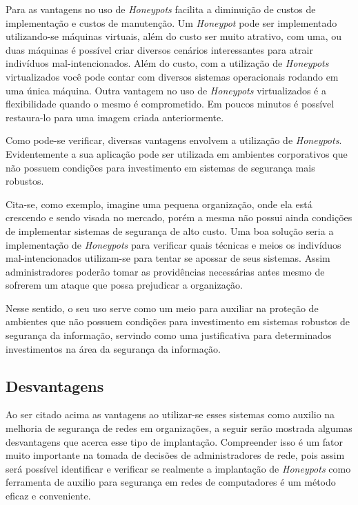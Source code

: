Para  as vantagens no uso de \textit{Honeypots} facilita a diminuição de custos de implementação e custos de manutenção. Um \textit{Honeypot} pode ser implementado utilizando-se máquinas virtuais, além do custo ser muito atrativo, com uma, ou duas máquinas é possível criar diversos cenários interessantes para atrair indivíduos mal-intencionados. Além do custo, com a utilização de \textit{Honeypots} virtualizados você pode contar com diversos sistemas operacionais rodando em uma única máquina. Outra vantagem no uso de \textit{Honeypots} virtualizados é a flexibilidade quando o mesmo é comprometido. Em poucos minutos é possível restaura-lo para uma imagem criada anteriormente.

Como pode-se verificar, diversas vantagens envolvem a utilização de \textit{Honeypots}. Evidentemente a sua aplicação pode ser utilizada em ambientes corporativos que não possuem condições para investimento em sistemas de segurança mais robustos.

Cita-se, como exemplo, imagine uma pequena organização, onde ela está crescendo e sendo visada no mercado, porém a mesma não possui ainda condições de implementar sistemas de segurança de alto custo. Uma boa solução seria a implementação de \textit{Honeypots} para verificar quais técnicas e meios os indivíduos mal-intencionados utilizam-se para tentar se apossar de seus sistemas. Assim administradores poderão tomar as providências necessárias antes mesmo de sofrerem um ataque que possa prejudicar a organização.

Nesse sentido, o seu uso serve como um meio para auxiliar na proteção de ambientes que não possuem condições para investimento em sistemas robustos de segurança da informação, servindo como uma justificativa para determinados investimentos na área da segurança da informação.

\subsection{Desvantagens}
Ao ser citado acima as vantagens ao utilizar-se esses sistemas como auxilio na melhoria de segurança de redes em organizações, a seguir serão mostrada algumas desvantagens que acerca esse tipo de implantação. Compreender isso é um fator muito importante na tomada de decisões de administradores de rede, pois assim será possível identificar e verificar se realmente a implantação de \textit{Honeypots} como ferramenta de auxilio para segurança em redes de computadores é um método eficaz e conveniente.

